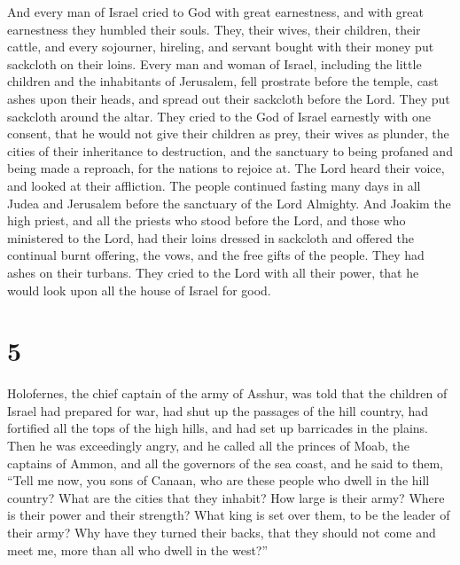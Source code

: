  And every man of Israel cried to God with great
earnestness, and with great earnestness they humbled their souls.
 They, their wives, their children, their cattle, and every
sojourner, hireling, and servant bought with their money put sackcloth
on their loins.  Every man and woman of Israel, including
the little children and the inhabitants of Jerusalem, fell prostrate
before the temple, cast ashes upon their heads, and spread out their
sackcloth before the Lord. They put sackcloth around the altar.
 They cried to the God of Israel earnestly with one
consent, that he would not give their children as prey, their wives as
plunder, the cities of their inheritance to destruction, and the
sanctuary to being profaned and being made a reproach, for the nations
to rejoice at.  The Lord heard their voice, and looked at
their affliction. The people continued fasting many days in all Judea
and Jerusalem before the sanctuary of the Lord Almighty. 
And Joakim the high priest, and all the priests who stood before the
Lord, and those who ministered to the Lord, had their loins dressed in
sackcloth and offered the continual burnt offering, the vows, and the
free gifts of the people.  They had ashes on their turbans.
They cried to the Lord with all their power, that he would look upon all
the house of Israel for good.

\hypertarget{section-4}{%
\section{5}\label{section-4}}

 Holofernes, the chief captain of the army of Asshur, was
told that the children of Israel had prepared for war, had shut up the
passages of the hill country, had fortified all the tops of the high
hills, and had set up barricades in the plains.  Then he was
exceedingly angry, and he called all the princes of Moab, the captains
of Ammon, and all the governors of the sea coast,  and he
said to them, ``Tell me now, you sons of Canaan, who are these people
who dwell in the hill country? What are the cities that they inhabit?
How large is their army? Where is their power and their strength? What
king is set over them, to be the leader of their army?  Why
have they turned their backs, that they should not come and meet me,
more than all who dwell in the west?''

